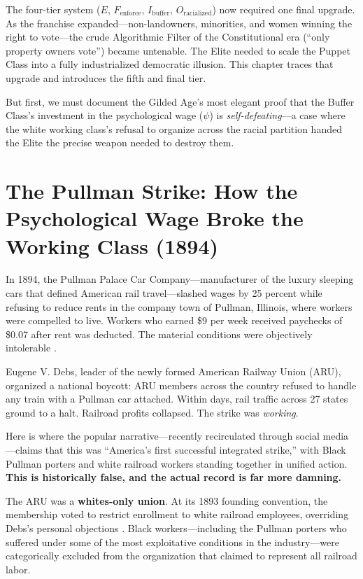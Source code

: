 \documentclass[12pt,openany]{book}
\begin{document}
\medskip

The four-tier system ($E$, $F_{\text{enforce}}$, $I_{\text{buffer}}$, $O_{\text{racialized}}$) now required one final upgrade. As the franchise expanded---non-landowners, minorities, and women winning the right to vote---the crude Algorithmic Filter of the Constitutional era (``only property owners vote'') became untenable. The Elite needed to scale the Puppet Class into a fully industrialized democratic illusion. This chapter traces that upgrade and introduces the fifth and final tier.

But first, we must document the Gilded Age's most elegant proof that the Buffer Class's investment in the psychological wage ($\psi$) is \textit{self-defeating}---a case where the white working class's refusal to organize across the racial partition handed the Elite the precise weapon needed to destroy them.

\section{The Pullman Strike: How the Psychological Wage Broke the Working Class (1894)}

In 1894, the Pullman Palace Car Company---manufacturer of the luxury sleeping cars that defined American rail travel---slashed wages by 25 percent while refusing to reduce rents in the company town of Pullman, Illinois, where workers were compelled to live. Workers who earned \$9 per week received paychecks of \$0.07 after rent was deducted. The material conditions were objectively intolerable \cite{lindsey_pullman, salvatore_debs}.

Eugene V. Debs, leader of the newly formed American Railway Union (ARU), organized a national boycott: ARU members across the country refused to handle any train with a Pullman car attached. Within days, rail traffic across 27 states ground to a halt. Railroad profits collapsed. The strike was \textit{working}.

Here is where the popular narrative---recently recirculated through social media---claims that this was ``America's first successful integrated strike,'' with Black Pullman porters and white railroad workers standing together in unified action. \textbf{This is historically false, and the actual record is far more damning.}

The ARU was a \textbf{whites-only union}. At its 1893 founding convention, the membership voted to restrict enrollment to white railroad employees, overriding Debs's personal objections \cite{salvatore_debs, arnesen_waterfront}. Black workers---including the Pullman porters who suffered under some of the most exploitative conditions in the industry---were categorically excluded from the organization that claimed to represent all railroad labor.
\end{document}
